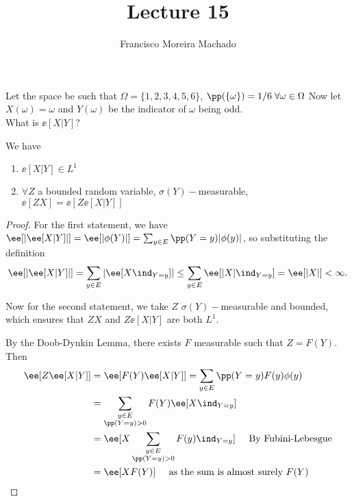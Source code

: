 \documentclass[../main.tex]{subfiles}
\author{Francisco Moreira Machado}
\title{Lecture 15}
\begin{document}
\begin{example}
  Let the space be such that
    $\Omega = \{ 1,2,3,4,5,6 \} $, $\pp(\{ \omega \} ) = 1/6 \;\forall \omega \in \Omega$
  Now let $X(\omega) = \omega$ and $Y(\omega)$ be the indicator of $\omega$ being odd.
  \\
  What is $\ee[X | Y]?$
\end{example}

\begin{lemma}
    We have
    \begin{enumerate}
      \item $\ee[X | Y] \in L^1$
      \item $\forall Z$ a bounded random variable, $\sigma(Y)-$measurable, 
        $\ee[ZX] = \ee[Z\ee[X | Y]]$
    \end{enumerate}
\end{lemma}
\begin{proof}
  For the first statement, we have $\ee[ |\ee[X | Y] |] = \ee[|\phi(Y)|] =
  \sum_{y \in E} \pp(Y = y) |\phi(y)|$, so substituting the definition 
  \[
    \ee[|\ee[X | Y]|] = \sum_{y \in E} |\ee[X \ind_{Y = y}]| \leq \sum_{y \in
    E} \ee[|X| \ind_{Y = y}] = \ee[|X|] < \infty
  .\] 

  \vspace{0.5em}\noindent
  Now for the second statement, we take $Z$ $\sigma(Y)-$measurable and
  bounded, which ensures that $ZX$ and $Z\ee[X | Y]$ are both $L^1$. 

  By the Doob-Dynkin Lemma, there exists $F$ measurable such that 
  $Z = F(Y)$. Then 
  \begin{align*}
    \ee[Z \ee[X | Y]] &= \ee[F(Y) \ee[X | Y]] = \sum_{y \in E}
    \pp(Y = y) F(y) \phi(y)  \\
    &= \sum_{\substack{y \in E \\ \pp(Y = y) > 0}} F(Y) \ee[X \ind_{Y = y}] \\
    &= \ee [ X \sum_{\substack{y \in E \\ \pp(Y = y) > 0}} F(y) \ind_{Y =
    y} ] \;\;\;\;\;\text{By Fubini-Lebesgue} \\
    &= \ee[X F(Y)] \;\;\;\;\;\text{as the sum is almost surely $F(Y)$}
  \end{align*}
\end{proof}
\end{document}
